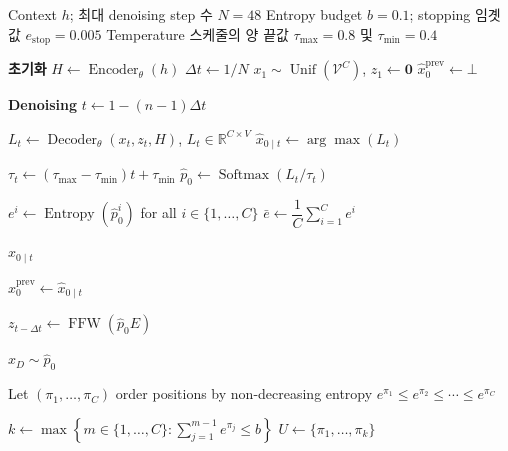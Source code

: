 \documentclass[11pt, a4paper, logo, copyright, gdm]{google}
\newcommand{\enc}{\operatorname{Encoder}_{\theta}}
\newcommand{\dec}{\operatorname{Decoder}_{\theta}}
\newcommand{\softmax}{\operatorname{Softmax}}
\newcommand{\unif}{\operatorname{Unif}}
\newcommand{\Vcal}{\mathcal{V}}
\begin{document}
\begin{algorithm}[t!]
\caption{Entropy-Bounded Denoising과
Adaptive Stopping을 사용하는 DiffusionGemma Sampling}
\label{alg:sampling}
\small
\begin{algorithmic}[1]
    \Require Context $h$; 최대 denoising step 수 $N=48$
    \Require Entropy budget $b=0.1$;
         stopping 임곗값 $e_{\mathrm{stop}}=0.005$
    \Require Temperature 스케줄의 양 끝값
         $\tau_{\max}=0.8$ 및 $\tau_{\min}=0.4$

    \Statex \textbf{초기화}
\State $H \gets \enc(h)$
\State $\Delta t \gets 1/N$
\State $x_1 \sim \unif(\Vcal^C)$,
    \quad $z_1 \gets \boldsymbol{0}$
\State $\hat{x}_0^{\mathrm{prev}} \gets \bot$

    \Statex \textbf{Denoising}
    \State $t \gets 1-(n-1)\Delta t$

    \State $L_t \gets \dec(x_t,z_t,H)$,
        \quad $L_t\in\mathbb{R}^{C\times V}$
    \State $\hat{x}_{0\mid t} \gets \arg\max(L_t)$

    \State $\tau_t \gets
        (\tau_{\max}-\tau_{\min})t+\tau_{\min}$
    \State $\hat{p}_0 \gets
        \softmax(L_t/\tau_t)$

    \State $e^i \gets
        \operatorname{Entropy}(\hat{p}_0^i)$
        for all $i\in\{1,\ldots,C\}$
    \State $\bar{e} \gets
        \dfrac{1}{C}\sum_{i=1}^{C}e^i$

        \State \Return $\hat{x}_{0\mid t}$
    \EndIf

    \State $\hat{x}_0^{\mathrm{prev}}
        \gets \hat{x}_{0\mid t}$

        \State $z_{t-\Delta t} \gets
            \operatorname{FFW}(\hat{p}_0E)$

        \State $x_D \sim \hat{p}_0$

        \State Let $(\pi_1,\ldots,\pi_C)$ order positions
            by non-decreasing entropy
        \Statex \hspace{\algorithmicindent}
            $e^{\pi_1}\leq e^{\pi_2}\leq\cdots\leq e^{\pi_C}$

        \State $k \gets
            \displaystyle\max\left\{
                m\in\{1,\ldots,C\}:
                \sum_{j=1}^{m-1}e^{\pi_j}\leq b
            \right\}$
        \State $U \gets \{\pi_1,\ldots,\pi_k\}$


\end{algorithmic}
\end{algorithm}
\end{document}

